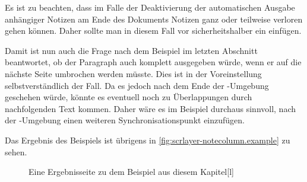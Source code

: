 Es ist zu beachten, dass im Falle der Deaktivierung der
automatischen Ausgabe anhängiger Notizen am Ende des Dokuments Notizen ganz
oder teilweise verloren gehen können. Daher sollte man in diesem Fall vor
 sicherheitshalber ein
 einfügen.

Damit ist nun auch die Frage nach dem Beispiel im letzten Abschnitt
beantwortet, ob der Paragraph auch komplett ausgegeben würde, wenn er auf die
nächste Seite umbrochen werden müsste. Dies ist in der Voreinstellung
selbstverständlich der Fall. Da es jedoch nach dem Ende der
-Umgebung geschehen würde, könnte es eventuell
noch zu Überlappungen durch nachfolgenden Text kommen. Daher wäre es im
Beispiel durchaus sinnvoll, nach der -Umgebung
einen weiteren Synchronisationspunkt einzufügen.

Das Ergebnis des Beispiels ist übrigens in
\autoref{fig:scrlayer-notecolumn.example} zu sehen.

\begin{figure}
  \setcapindent{0pt}%
  \begin{captionbeside}%
    {Eine Ergebnisseite zu dem Beispiel aus diesem
      Kapitel\label{fig:scrlayer-notecolumn.example}}[l]
  \end{captionbeside}
\end{figure}
\EndIndexGroup
%
\EndIndexGroup



